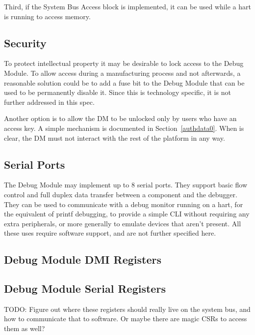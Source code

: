\documentclass{article}
\begin{document}
Third, if the System Bus Access block is implemented, it can be used while a
hart is running to access memory.

\subsection{Security}

To protect intellectual property it may be desirable to lock access to the
Debug Module.  To allow access during a manufacturing process and not
afterwards, a reasonable solution could be to add a fuse bit to the Debug
Module that can be used to be permanently disable it. Since this is technology
specific, it is not further addressed in this spec.

Another option is to allow the DM to be unlocked only by users who  have an
access key. A simple mechanism is documented in Section~\ref{authdata0}. When
\Fauthenticated is clear, the DM must not interact with the rest of the
platform in any way.

\subsection{Serial Ports}

The Debug Module may implement up to 8 serial ports. They support basic flow
control and full duplex data transfer between a component and the debugger.
They can be used to communicate with a debug monitor running on a hart, for the
equivalent of printf debugging, to provide a simple CLI without requiring any
extra peripherals, or more generally to emulate devices that aren't present.
All these uses require software support, and are not further specified here.

\subsection{Debug Module DMI Registers} \label{dmdebbus}



\subsection{Debug Module Serial Registers} \label{dmsysbus}

TODO: Figure out where these registers should really live on the system bus,
and how to communicate that to software. Or maybe there are magic CSRs to
access them as well?


\end{document}
